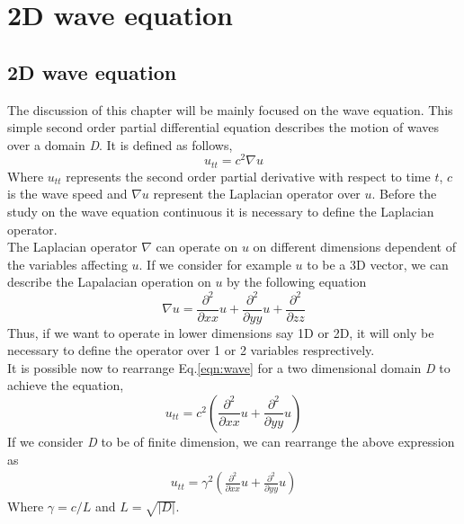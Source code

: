 %
%
%



\chapter{2D wave equation}
\label{chapter3}
\section{2D wave equation}
\label{chapter3:sec1}
The discussion of this chapter will be mainly focused on the wave equation. This simple second order partial differential equation describes the motion of waves over a domain \textit{D}. It is defined as follows,
\begin{equation}
\label{eqn:wave}
	u_{tt}=c^{2}\nabla u
\end{equation} 
Where $u_{tt}$ represents the second order partial derivative with respect to time $t$, $c$ is the wave speed and $\nabla u$ represent the Laplacian operator over $u$. Before the study on the wave equation continuous it is necessary to define the Laplacian operator.\\
The Laplacian operator $\nabla$ can operate on $u$ on different dimensions dependent of the variables affecting $u$. If we consider for example $u$ to be a 3D vector, we can describe the Lapalacian operation on $u$ by the following equation
\begin{equation}
	\nabla u = \frac{\partial^2}{\partial xx}u + \frac{\partial^{2}}{\partial yy}u + \frac{\partial^{2}}{\partial zz}
\end{equation}
Thus, if we want to operate in lower dimensions say 1D or 2D, it will only be necessary to define the operator over 1 or 2 variables resprectively.\\
It is possible now to rearrange Eq.\ref{eqn:wave} for a two dimensional domain \textit{D} to achieve the equation,
\begin{equation}
	u_{tt}=c^{2}( \frac{\partial^2}{\partial xx}u + \frac{\partial^{2}}{\partial yy}u)	
\end{equation}
 If we consider \textit{D} to be of finite dimension, we can rearrange the above expression as
\begin{equation}
\label{eqn:wave2}
	\begin{aligned}
	u_{tt}=\gamma^{2}(\frac{\partial^2}{\partial xx}u + \frac{\partial^{2}}{\partial yy}u)
	\end{aligned}
\end{equation}
Where $\gamma=c/L$ and $L=\sqrt{|D|}$.\\

